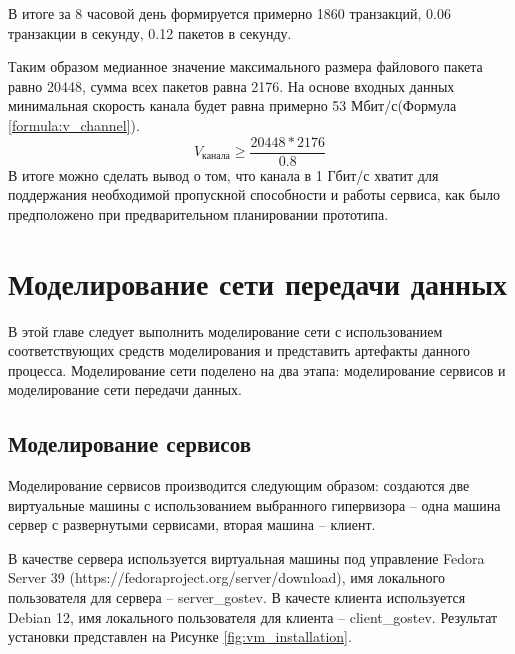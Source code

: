 \documentclass[14pt, a4paper]{extarticle}
\numberwithin{equation}{section}
\begin{document}
В итоге за 8 часовой день формируется примерно 1860 транзакций,
0.06 транзакции в секунду, 0.12 пакетов в секунду.


Таким образом медианное значение максимального размера файлового пакета равно 20448, сумма всех пакетов равна 2176.
На основе входных данных минимальная скорость канала будет равна примерно 53 Мбит/с(Формула \ref{formula:v_channel}).
\begin{equation}
        V_\text{канала} \ge \frac{20448 * 2176}{0.8}
        \label{formula:v_channel}
\end{equation}
В итоге можно сделать вывод о том, что канала в 1 Гбит/с хватит для поддержания необходимой пропускной способности и работы сервиса, как было предположено при предварительном планировании прототипа. 


\section{Моделирование сети передачи данных}
В этой главе следует выполнить моделирование сети с использованием соответствующих 
средств моделирования и представить артефакты данного процесса. 
Моделирование сети поделено на два этапа: моделирование сервисов и моделирование сети передачи данных. 

\subsection{Моделирование сервисов}
Моделирование сервисов производится следующим образом: 
создаются две виртуальные машины с использованием выбранного гипервизора – 
одна машина сервер с развернутыми сервисами, вторая машина – клиент.

В качестве сервера используется виртуальная машины под управление Fedora Server 39 \cite{}(https://fedoraproject.org/server/download), 
имя локального пользователя для сервера -- server\_gostev.
В качесте клиента используется Debian 12, имя локального пользователя для клиента -- client\_gostev. 
Результат установки представлен на Рисунке \ref{fig:vm_installation}.
\end{document}
